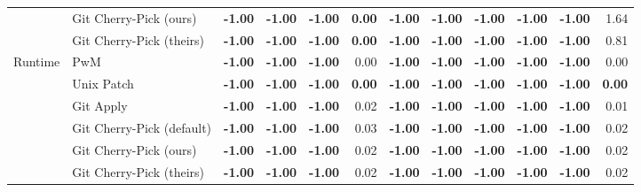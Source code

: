 \begin{tabular}{|l|l|r|r|r|r|r|r|r|r|r|r|}
 & Git Cherry-Pick (ours) & \textbf{-1.00} & \textbf{-1.00} & \textbf{-1.00} & \textbf{0.00} & \textbf{-1.00} & \textbf{-1.00} & \textbf{-1.00} & \textbf{-1.00} & \textbf{-1.00} & 1.64 \\
 & Git Cherry-Pick (theirs) & \textbf{-1.00} & \textbf{-1.00} & \textbf{-1.00} & \textbf{0.00} & \textbf{-1.00} & \textbf{-1.00} & \textbf{-1.00} & \textbf{-1.00} & \textbf{-1.00} & 0.81 \\
\hline
\multirow{6}{*}{Runtime}
 & PwM & \textbf{-1.00} & \textbf{-1.00} & \textbf{-1.00} & 0.00 & \textbf{-1.00} & \textbf{-1.00} & \textbf{-1.00} & \textbf{-1.00} & \textbf{-1.00} & 0.00 \\
 & Unix Patch & \textbf{-1.00} & \textbf{-1.00} & \textbf{-1.00} & \textbf{0.00} & \textbf{-1.00} & \textbf{-1.00} & \textbf{-1.00} & \textbf{-1.00} & \textbf{-1.00} & \textbf{0.00} \\
 & Git Apply & \textbf{-1.00} & \textbf{-1.00} & \textbf{-1.00} & 0.02 & \textbf{-1.00} & \textbf{-1.00} & \textbf{-1.00} & \textbf{-1.00} & \textbf{-1.00} & 0.01 \\
 & Git Cherry-Pick (default) & \textbf{-1.00} & \textbf{-1.00} & \textbf{-1.00} & 0.03 & \textbf{-1.00} & \textbf{-1.00} & \textbf{-1.00} & \textbf{-1.00} & \textbf{-1.00} & 0.02 \\
 & Git Cherry-Pick (ours) & \textbf{-1.00} & \textbf{-1.00} & \textbf{-1.00} & 0.02 & \textbf{-1.00} & \textbf{-1.00} & \textbf{-1.00} & \textbf{-1.00} & \textbf{-1.00} & 0.02 \\
 & Git Cherry-Pick (theirs) & \textbf{-1.00} & \textbf{-1.00} & \textbf{-1.00} & 0.02 & \textbf{-1.00} & \textbf{-1.00} & \textbf{-1.00} & \textbf{-1.00} & \textbf{-1.00} & 0.02 \\
\hline
\end{tabular}